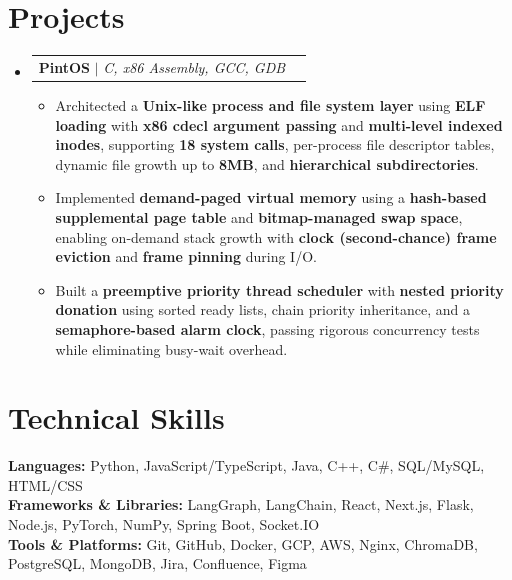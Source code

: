 \documentclass[letterpaper,10.5pt]{article}
\makeatletter
\newcommand{\resumeItem}[1]{
  \item\small{
    {#1 \vspace{-2pt}}
  }
}
\newcommand{\resumeProjectHeading}[2]{
    \item
    \begin{tabular*}{1.001\textwidth}{l@{\extracolsep{\fill}}r}
      \small#1 & \textbf{\small #2}\\
    \end{tabular*}\vspace{-7pt}
}
\newcommand{\resumeSubHeadingListStart}{\begin{itemize}[leftmargin=0.0in, label={}]}
\newcommand{\resumeSubHeadingListEnd}{\end{itemize}}
\newcommand{\resumeItemListStart}{\begin{itemize}}
\newcommand{\resumeItemListEnd}{\end{itemize}\vspace{-5pt}}
\makeatother
\begin{document}
\section{Projects}
    \vspace{-5pt}
    \resumeSubHeadingListStart
        \resumeProjectHeading
          {\textbf{PintOS} $|$ \emph{C, x86 Assembly, GCC, GDB}}{}
          \resumeItemListStart
              \resumeItem{Architected a \textbf{Unix-like process and file system layer} using \textbf{ELF loading} with \textbf{x86 cdecl argument passing} and \textbf{multi-level indexed inodes}, supporting \textbf{18 system calls}, per-process file descriptor tables, dynamic file growth up to \textbf{8MB}, and \textbf{hierarchical subdirectories}.}
            \resumeItem{Implemented \textbf{demand-paged virtual memory} using a \textbf{hash-based supplemental page table} and \textbf{bitmap-managed swap space}, enabling on-demand stack growth with \textbf{clock (second-chance) frame eviction} and \textbf{frame pinning} during I/O.}
            \resumeItem{Built a \textbf{preemptive priority thread scheduler} with \textbf{nested priority donation} using sorted ready lists, chain priority inheritance, and a \textbf{semaphore-based alarm clock}, passing rigorous concurrency tests while eliminating busy-wait overhead.}
          \resumeItemListEnd
    \resumeSubHeadingListEnd
\vspace{-15pt}

\section{Technical Skills}
 \begin{itemize}[leftmargin=0.15in, label={}]
    \small{\item{
    \textbf{Languages:} Python, JavaScript/TypeScript, Java, C++, C\#, SQL/MySQL, HTML/CSS \\
    \textbf{Frameworks \& Libraries:} LangGraph, LangChain, React, Next.js, Flask, Node.js, PyTorch, NumPy, Spring Boot, Socket.IO \\
    \textbf{Tools \& Platforms:} Git, GitHub, Docker, GCP, AWS, Nginx, ChromaDB, PostgreSQL, MongoDB, Jira, Confluence, Figma \\
    }}
 \end{itemize}
 \vspace{-16pt}


%
\end{document}
